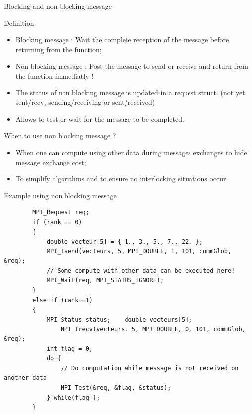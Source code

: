 \documentclass[compress,10pt,aspectratio=169]{beamer}
\begin{document}
\begin{frame}[fragile]{Blocking and non blocking message}
    \scriptsize
    \begin{block}{Definition}
        \begin{itemize}
            \item Blocking message : Wait the complete reception of the message before returning from the function;
            \item Non blocking message : Post the message to send or receive and return from the function immediatly ! 
            \item The status of non blocking message is updated in a request struct. (not yet sent/recv, sending/receiving or sent/received)
            \item Allows to test or wait for the message to be completed. 
        \end{itemize}
    \end{block}

    \begin{exampleblock}{When to use non blocking message ?}
        \begin{itemize}
            \item When one can compute using other data during messages exchanges to hide message exchange cost;
            \item To simplify algorithms and to ensure no interlocking situations occur.
        \end{itemize}
    \end{exampleblock}

\end{frame}

\begin{frame}[fragile]{Example using non blocking message}
    
    \begin{verbatim}
        MPI_Request req;
        if (rank == 0) 
        {
            double vecteur[5] = { 1., 3., 5., 7., 22. };
            MPI_Isend(vecteurs, 5, MPI_DOUBLE, 1, 101, commGlob, &req);
            // Some compute with other data can be executed here!
            MPI_Wait(req, MPI_STATUS_IGNORE);
        }
        else if (rank==1) 
        {
            MPI_Status status;    double vecteurs[5];
                MPI_Irecv(vecteurs, 5, MPI_DOUBLE, 0, 101, commGlob, &req);
            int flag = 0;
            do {
                // Do computation while message is not received on another data
                MPI_Test(&req, &flag, &status);
            } while(flag );
        }
        \end{verbatim}
\end{frame}
\end{document}
